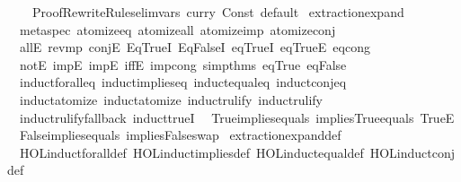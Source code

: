 \begin{isabellebody}
\ \ \ \ Proof{\isacharunderscore}{\kern0pt}Rewrite{\isacharunderscore}{\kern0pt}Rules{\isachardot}{\kern0pt}elim{\isacharunderscore}{\kern0pt}vars\ {\isacharparenleft}{\kern0pt}curry\ Const\ \isactrlconstUNDERSCOREname {\isasymopen}default{\isasymclose}{\isacharparenright}{\kern0pt}{\isacharparenright}{\kern0pt}\isanewline
{\isacartoucheclose}%
\endisatagML
{\isafoldML}%
%
\isadelimML
\isanewline
%
\endisadelimML
\isanewline
{}\isamarkupfalse%
\ {\isacharbrackleft}{\kern0pt}extraction{\isacharunderscore}{\kern0pt}expand{\isacharbrackright}{\kern0pt}\ {\isacharequal}{\kern0pt}\isanewline
\ \ meta{\isacharunderscore}{\kern0pt}spec\ atomize{\isacharunderscore}{\kern0pt}eq\ atomize{\isacharunderscore}{\kern0pt}all\ atomize{\isacharunderscore}{\kern0pt}imp\ atomize{\isacharunderscore}{\kern0pt}conj\isanewline
\ \ allE\ rev{\isacharunderscore}{\kern0pt}mp\ conjE\ Eq{\isacharunderscore}{\kern0pt}TrueI\ Eq{\isacharunderscore}{\kern0pt}FalseI\ eqTrueI\ eqTrueE\ eq{\isacharunderscore}{\kern0pt}cong{}\isanewline
\ \ notE{\isacharprime}{\kern0pt}\ impE{\isacharprime}{\kern0pt}\ impE\ iffE\ imp{\isacharunderscore}{\kern0pt}cong\ simp{\isacharunderscore}{\kern0pt}thms\ eq{\isacharunderscore}{\kern0pt}True\ eq{\isacharunderscore}{\kern0pt}False\isanewline
\ \ induct{\isacharunderscore}{\kern0pt}forall{\isacharunderscore}{\kern0pt}eq\ induct{\isacharunderscore}{\kern0pt}implies{\isacharunderscore}{\kern0pt}eq\ induct{\isacharunderscore}{\kern0pt}equal{\isacharunderscore}{\kern0pt}eq\ induct{\isacharunderscore}{\kern0pt}conj{\isacharunderscore}{\kern0pt}eq\isanewline
\ \ induct{\isacharunderscore}{\kern0pt}atomize\ induct{\isacharunderscore}{\kern0pt}atomize{\isacharprime}{\kern0pt}\ induct{\isacharunderscore}{\kern0pt}rulify\ induct{\isacharunderscore}{\kern0pt}rulify{\isacharprime}{\kern0pt}\isanewline
\ \ induct{\isacharunderscore}{\kern0pt}rulify{\isacharunderscore}{\kern0pt}fallback\ induct{\isacharunderscore}{\kern0pt}trueI\isanewline
\ \ True{\isacharunderscore}{\kern0pt}implies{\isacharunderscore}{\kern0pt}equals\ implies{\isacharunderscore}{\kern0pt}True{\isacharunderscore}{\kern0pt}equals\ TrueE\isanewline
\ \ False{\isacharunderscore}{\kern0pt}implies{\isacharunderscore}{\kern0pt}equals\ implies{\isacharunderscore}{\kern0pt}False{\isacharunderscore}{\kern0pt}swap\isanewline
\isanewline
{}\isamarkupfalse%
\ {\isacharbrackleft}{\kern0pt}extraction{\isacharunderscore}{\kern0pt}expand{\isacharunderscore}{\kern0pt}def{\isacharbrackright}{\kern0pt}\ {\isacharequal}{\kern0pt}\isanewline
\ \ HOL{\isachardot}{\kern0pt}induct{\isacharunderscore}{\kern0pt}forall{\isacharunderscore}{\kern0pt}def\ HOL{\isachardot}{\kern0pt}induct{\isacharunderscore}{\kern0pt}implies{\isacharunderscore}{\kern0pt}def\ HOL{\isachardot}{\kern0pt}induct{\isacharunderscore}{\kern0pt}equal{\isacharunderscore}{\kern0pt}def\ HOL{\isachardot}{\kern0pt}induct{\isacharunderscore}{\kern0pt}conj{\isacharunderscore}{\kern0pt}def\isanewline

\end{isabellebody}
